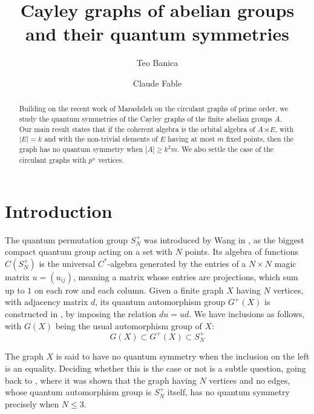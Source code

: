 \documentclass[11pt]{amsart}
\begin{document}
\title[Cayley graphs of abelian groups]{Cayley graphs of abelian groups and their quantum symmetries}

\author{Teo Banica}
\author{Claude Fable}


\begin{abstract}
Building on the recent work of Marashdeh on the circulant graphs of prime order, we study the quantum symmetries of the Cayley graphs of the finite abelian groups $A$. Our main result states that if the coherent algebra is the orbital algebra of $A\rtimes E$, with $|E|=k$ and with the non-trivial elements of $E$ having at most $m$ fixed points, then the graph has no quantum symmetry when $|A|\geq k^2m$. We also settle the case of the circulant graphs with $p^n$ vertices.
\end{abstract}

\maketitle

{\hypersetup{linkcolor=magenta}\tableofcontents}

\section*{Introduction}

The quantum permutation group $S_N^+$ was introduced by Wang in \cite{wan}, as the biggest compact quantum group acting on a set with $N$ points. Its algebra of functions $C(S_N^+)$ is the universal $C^*$-algebra generated by the entries of a $N\times N$ magic matrix $u=(u_{ij})$, meaning a matrix whose entries are projections, which sum up to $1$ on each row and each column. Given a finite graph $X$ having $N$ vertices, with adjacency matrix $d$, its quantum automorphism group $G^+(X)$ is constructed in \cite{ba2}, by imposing the relation $du=ud$. We have inclusions as follows, with $G(X)$ being the usual automorphism group of $X$:
$$G(X)\subset G^+(X)\subset S_N^+$$

The graph $X$ is said to have no quantum symmetry when the inclusion on the left is an equality. Deciding whether this is the case or not is a subtle question, going back to \cite{wan}, where it was shown that the graph having $N$ vertices and no edges, whose quantum automorphism group is $S_N^+$ itself, has no quantum symmetry precisely when $N\leq3$.
\end{document}
